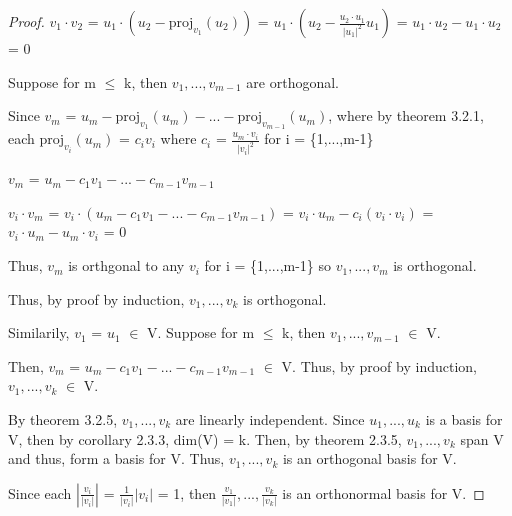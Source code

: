     \begin{proof}
        $v_1 \cdot v_2$
        = $u_1 \cdot (u_2 - \text{proj}_{v_1}(u_2))$
        = $u_1 \cdot (u_2 - \frac{u_2 \cdot u_1}{|u_1|^2}u_1)$
        = $u_1 \cdot u_2 - u_1 \cdot u_2$
        = 0

        Suppose for m $\leq$ k, then $v_1,...,v_{m-1}$ are orthogonal.

        Since $v_m$ =
        $u_m - \text{proj}_{v_1}(u_m) - ... - \text{proj}_{v_{m-1}}(u_m)$, where
        by {\color{red} theorem 3.2.1}, each
        $\text{proj}_{v_i}(u_m)$ = $c_iv_i$
        where $c_i$ = $\frac{u_m \cdot v_i}{|v_i|^2}$
        for i = \{1,...,m-1\}

        \hspace{0.5cm}
        $v_m$ = $u_m - c_1v_1 - ... - c_{m-1}v_{m-1}$

        \hspace{0.5cm}
        $v_i \cdot v_m$
        = $v_i \cdot (u_m - c_1v_1 - ... - c_{m-1}v_{m-1})$
        = $v_i \cdot u_m - c_i(v_i \cdot v_i)$
        = $v_i \cdot u_m - u_m \cdot v_i$
        = 0

        Thus, $v_m$ is orthgonal to any $v_i$ for i = \{1,...,m-1\}
        so $v_1,...,v_m$ is orthogonal.

        Thus, by proof by induction, $v_1,...,v_k$ is orthogonal.
        
        Similarily, $v_1$ = $u_1$ $\in$ V.
        Suppose for m $\leq$ k, then $v_1,...,v_{m-1}$ $\in$ V.

        Then, $v_m$ = $u_m - c_1v_1 - ... - c_{m-1}v_{m-1}$ $\in$ V.
        Thus, by proof by induction, $v_1,...,v_k$ $\in$ V.

        By {\color{red} theorem 3.2.5}, $v_1,...,v_k$
        are linearly independent. Since $u_1,...,u_k$ is a basis for V,
        then by {\color{orange} corollary 2.3.3}, dim(V) = k.
        Then, by {\color{red} theorem 2.3.5}, $v_1,...,v_k$
        span V and thus, form a basis for V.
        Thus, $v_1,...,v_k$ is an orthogonal basis for V.

        Since each $|\frac{v_i}{|v_i|}|$ = $\frac{1}{|v_i|}|v_i|$ = 1,
        then $\frac{v_1}{|v_1|},...,\frac{v_k}{|v_k|}$ is an orthonormal
        basis for V.
    \end{proof}

    \newpage



